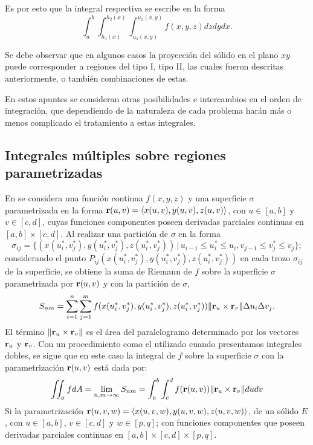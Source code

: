 Es por esto que la integral respectiva se escribe en la forma
\[\int_a^b\int_{h_1(x)}^{h_2(x)} \int_{u_1(x,y)} ^{u_2(x,y)} f(x,y,z) dz dydx.\]

Se debe observar que en algunos casos la proyección del sólido en el plano $xy$ puede corresponder a regiones del tipo I,
tipo II, las cuales fueron descritas anteriormente, o también combinaciones de estas.

En estos apuntes se consideran otras posibilidades e intercambios en el orden de integración, que dependiendo de la naturaleza de cada problema harán más o menos complicado el tratamiento a estas integrales.

\subsection{Integrales múltiples sobre regiones parametrizadas}

En \cite{acosta_gempeler_doce_2020} se considera una función continua $f(x,y,z)$ y una superficie $\sigma$
parametrizada en la forma ${\bf r}(u,v)= \langle x(u,v), y(u,v), z(u,v) \rangle$,
con $u \in [a,b]$ y $v \in [c,d]$, cuyas funciones componentes poseen derivadas parciales continuas en $[a,b] \times [c,d]$. Al realizar una partición de $\sigma$ en la forma
\[\sigma_{ij}= \{ (x(u_i^\ast,v_j^\ast),y(u_i^\ast,v_j^\ast),z(u_i^\ast,v_j^\ast) )\,|\, u_{i-1} \leq u_i^\ast \leq u_{i}, v_{j-1} \leq v_{j}^\ast \leq v_{j}\} ;\]
considerando el punto $P_{ij}(x(u_i^\ast,v_j^\ast),y(u_i^\ast,v_j^\ast),z(u_i^\ast,v_j^\ast) )$ en cada trozo $\sigma_{ij}$
de la superficie, se obtiene la suma de Riemann de $f$ sobre la superficie $\sigma$ parametrizada por ${\bf r}(u,v)$ y con la partición de $\sigma$,
\[ S_{nm}=\sum_{i=1}^n \sum_{j=1}^m f(x(u_i^\ast,v_j^\ast),y(u_i^\ast,v_j^\ast),z(u_i^\ast,v_j^\ast) ) \Vert {\bf r}_u \times {\bf r}_v \Vert \Delta u_i \Delta v_j .\]
El término $\Vert {\bf r}_u \times {\bf r}_v \Vert $ es el área del paralelogramo determinado por
los vectores ${\bf r}_u$ y ${\bf r}_v$.
Con un procedimiento como el utilizado cuando presentamos integrales dobles, se sigue que en este caso la integral de $f$
sobre la superficie $\sigma$ con la parametrización ${\bf r}(u,v)$ está dada por:
\begin{equation}
\iint_\sigma f dA = \lim_{n,m \to \infty} S_{nm}  = \int_a^b\int_c^d f({\bf r}(u,v)) \Vert {\bf r}_u \times {\bf r}_v \Vert dudv  \label{integralesdobles2}
\end{equation}
Si la parametrización ${\bf r}(u,v,w)= \langle x(u,v,w), y(u,v,w), z(u,v,w) \rangle$,
de un sólido $E$, con $u \in [a,b]$, $v \in [c,d]$ y $w \in [p,q]$;
con funciones componentes que poseen derivadas parciales continuas en
$[a,b] \times [c,d] \times [p,q]$.

